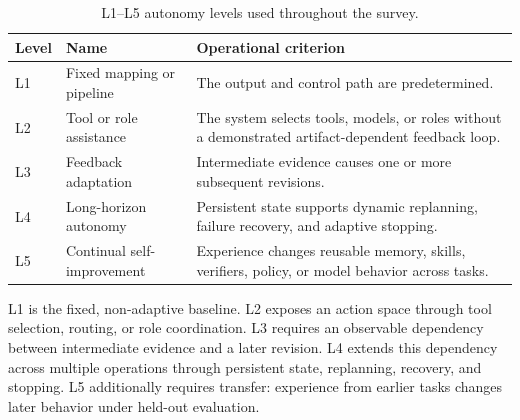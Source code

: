 \begin{table}[t]
  \caption{L1--L5 autonomy levels used throughout the survey.}
  \label{tab:autonomy}
  \small
  \begin{tabularx}{\columnwidth}{@{}llX@{}}
    \toprule
    Level & Name & Operational criterion \\
    \midrule
    L1 & Fixed mapping or pipeline & The output and control path are predetermined. \\
    L2 & Tool or role assistance & The system selects tools, models, or roles without a demonstrated artifact-dependent feedback loop. \\
    L3 & Feedback adaptation & Intermediate evidence causes one or more subsequent revisions. \\
    L4 & Long-horizon autonomy & Persistent state supports dynamic replanning, failure recovery, and adaptive stopping. \\
    L5 & Continual self-improvement & Experience changes reusable memory, skills, verifiers, policy, or model behavior across tasks. \\
    \bottomrule
  \end{tabularx}
\end{table}

L1 is the fixed, non-adaptive baseline. L2 exposes an action space through tool selection, routing, or role coordination. L3 requires an observable dependency between intermediate evidence and a later revision. L4 extends this dependency across multiple operations through persistent state, replanning, recovery, and stopping. L5 additionally requires transfer: experience from earlier tasks changes later behavior under held-out evaluation.
